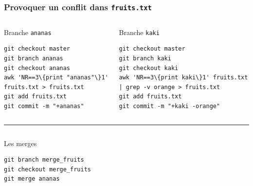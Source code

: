 \documentclass[table,tikz,12pt,svgnames]{beamer}
\begin{document}

\begin{frame}[fragile]
\frametitle{Provoquer un conflit dans \texttt{fruits.txt}}
\begin{adjustwidth}{-0.3cm}{-0.3cm}{}
\vspace{-0.2em}
\begin{columns}[T] %
	\begin{column}{.52\textwidth}
		\color{darkgreen}
		Branche \texttt{ananas}
		\color{black}
\begin{verbatim}
git checkout master
git branch ananas
git checkout ananas
awk 'NR==3\{print "ananas"\}1' fruits.txt > fruits.txt
git add fruits.txt
git commit -m "+ananas"
\end{verbatim}
	\end{column}%
	\hfill%
	\begin{column}{.52\textwidth}
		\vspace{-0.2em}
		\color{blue}%
		Branche \texttt{kaki}
		\color{black}
		\vspace{-0.3em}
\begin{verbatim}
git checkout master
git branch kaki
git checkout kaki
awk 'NR==3\{print kaki\}1' fruits.txt | grep -v orange > fruits.txt
git add fruits.txt
git commit -m "+kaki -orange"
\end{verbatim}
\end{column}%
\end{columns}
\end{adjustwidth}

\color{gray}\rule{\linewidth}{3pt}
\color{black}
\vspace{-0.82em}

\begin{adjustwidth}{0.4cm}{-1cm}{}
	\vspace{-0.48em}
	\begin{columns}[T] %
		\begin{column}{.45\textwidth}
\color{darkgreen}%
Les merges
\color{black}
\begin{verbatim}
git branch merge_fruits
git checkout merge_fruits
git merge ananas
\end{verbatim}
\end{column}%
\hfill%
\begin{column}{.6\textwidth}


\end{column}
\end{columns}
\end{adjustwidth}
\end{frame}
\end{document}
